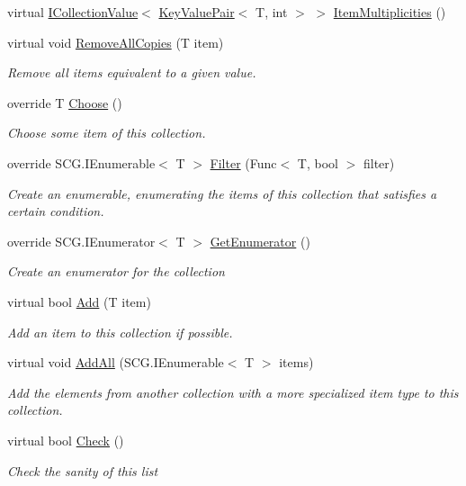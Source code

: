 \begin{DoxyCompactItemize}
\item 
virtual \hyperlink{interface_c5_1_1_i_collection_value}{I\+Collection\+Value}$<$ \hyperlink{struct_c5_1_1_key_value_pair}{Key\+Value\+Pair}$<$ T, int $>$ $>$ \hyperlink{class_c5_1_1_hashed_linked_list_a0cee8e4c1768986a4d167f34c8a3c227}{Item\+Multiplicities} ()
\item 
virtual void \hyperlink{class_c5_1_1_hashed_linked_list_ad3b535da6c6624412c450c96560d2f51}{Remove\+All\+Copies} (T item)
\begin{DoxyCompactList}\small\item\em Remove all items equivalent to a given value. \end{DoxyCompactList}\item 
override T \hyperlink{class_c5_1_1_hashed_linked_list_a8f4365d623d3424943b1891e998fc90d}{Choose} ()
\begin{DoxyCompactList}\small\item\em Choose some item of this collection. \end{DoxyCompactList}\item 
override S\+C\+G.\+I\+Enumerable$<$ T $>$ \hyperlink{class_c5_1_1_hashed_linked_list_ad092b0255821d358df6cfe045870e256}{Filter} (Func$<$ T, bool $>$ filter)
\begin{DoxyCompactList}\small\item\em Create an enumerable, enumerating the items of this collection that satisfies a certain condition. \end{DoxyCompactList}\item 
override S\+C\+G.\+I\+Enumerator$<$ T $>$ \hyperlink{class_c5_1_1_hashed_linked_list_ae8f40668f13afb6cb05501446a3bcc4e}{Get\+Enumerator} ()
\begin{DoxyCompactList}\small\item\em Create an enumerator for the collection \end{DoxyCompactList}\item 
virtual bool \hyperlink{class_c5_1_1_hashed_linked_list_afcfc7b8da2f00ad7d8e3decadadd74bc}{Add} (T item)
\begin{DoxyCompactList}\small\item\em Add an item to this collection if possible. \end{DoxyCompactList}\item 
virtual void \hyperlink{class_c5_1_1_hashed_linked_list_a546555b545da25f99c4ca0e1dc31ddab}{Add\+All} (S\+C\+G.\+I\+Enumerable$<$ T $>$ items)
\begin{DoxyCompactList}\small\item\em Add the elements from another collection with a more specialized item type to this collection. \end{DoxyCompactList}\item 
virtual bool \hyperlink{class_c5_1_1_hashed_linked_list_a03cc4fb3b1f5e3172df5ac12f72167b3}{Check} ()
\begin{DoxyCompactList}\small\item\em Check the sanity of this list \end{DoxyCompactList}\end{DoxyCompactItemize}
